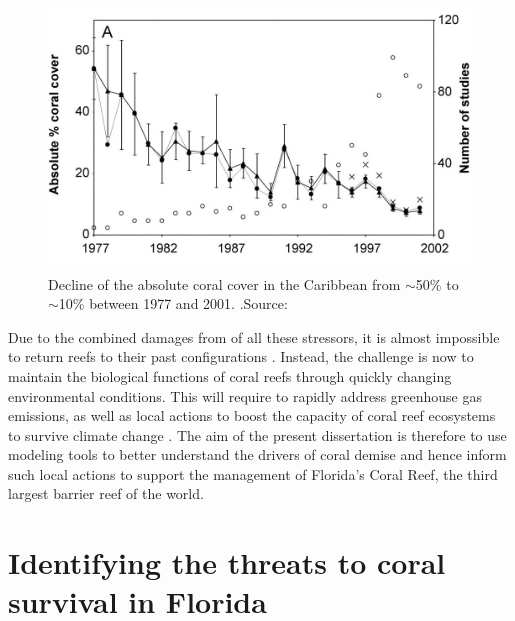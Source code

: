\begin{figure}
    \centering
    \includegraphics[width=.9\textwidth]{chapters/intro/figures/cover.jpeg}
    \caption{Decline of the absolute coral cover in the Caribbean from $\sim$50\% to $\sim$10\% between 1977 and 2001.  .Source: \cite{gardner2003long}}
    \label{intro:cover}
\end{figure}

Due to the combined damages from of all these stressors, it is almost impossible to return reefs to their past configurations \citep{hughes2017coral}. Instead, the challenge is now to maintain the biological functions of coral reefs through quickly changing environmental conditions. This will require to rapidly address greenhouse gas emissions, as well as local actions to boost the capacity of coral reef ecosystems to survive climate change \citep{hughes2003climate,knowlton2008shifting,graham2015predicting,kleypas2021designing}. The aim of the present dissertation is therefore to use modeling tools to better understand the drivers of coral demise and hence inform such local actions to support the management of Florida's Coral Reef, the third largest barrier reef of the world.

\section{Identifying the threats to coral survival in Florida}

